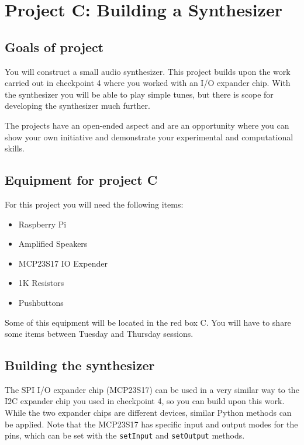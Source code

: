 \newpage


\newpage
\section{Project C: Building a Synthesizer}

\subsection{Goals of project}

You will construct a small audio synthesizer.
This project builds upon the work carried out in checkpoint 4 where you worked with an I/O expander chip.
With the synthesizer you will be able to play simple tunes, but there is scope for developing the synthesizer much further.

The projects have an open-ended aspect and are an opportunity where you can show your own initiative and demonstrate your experimental and computational skills. 


\subsection{Equipment for project C}

For this project you will need the following items:
\begin{itemize}
\item Raspberry Pi
\item Amplified Speakers
\item MCP23S17 IO Expender
\item 1K Resistors
\item Pushbuttons
\end{itemize}
Some of this equipment will be located in the red box C.
You will have to share some items between Tuesday and Thursday sessions.


\subsection{Building the synthesizer}

The SPI I/O expander chip (MCP23S17) can be used in a very similar way to the I2C expander chip you used in checkpoint 4, so you can build upon this work.
While the two expander chips are different devices, similar Python methods can be applied.
Note that the MCP23S17 has specific input and output modes for the pins, which can be set with the \texttt{setInput} and \texttt{setOutput} methods.

